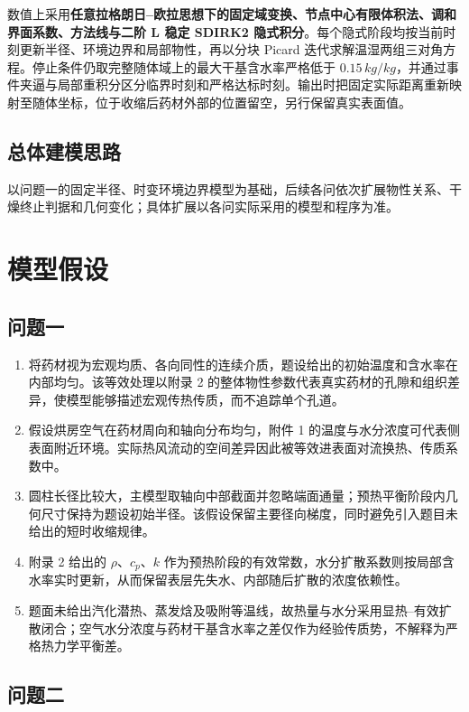 \documentclass[withoutpreface,bwprint]{cumcmthesis}
\begin{document}
数值上采用\textbf{任意拉格朗日--欧拉思想下的固定域变换、节点中心有限体积法、调和界面系数、方法线与二阶 L 稳定 SDIRK2 隐式积分}。每个隐式阶段均按当前时刻更新半径、环境边界和局部物性，再以分块 Picard 迭代求解温湿两组三对角方程。停止条件仍取完整随体域上的最大干基含水率严格低于 $0.15\,\si{kg/kg}$，并通过事件夹逼与局部重积分区分临界时刻和严格达标时刻。输出时把固定实际距离重新映射至随体坐标，位于收缩后药材外部的位置留空，另行保留真实表面值。

\subsection{总体建模思路}

以问题一的固定半径、时变环境边界模型为基础，后续各问依次扩展物性关系、干燥终止判据和几何变化；具体扩展以各问实际采用的模型和程序为准。

\section{模型假设}

\subsection{问题一}

\begin{enumerate}
  \item 将药材视为宏观均质、各向同性的连续介质，题设给出的初始温度和含水率在内部均匀。该等效处理以附录 2 的整体物性参数代表真实药材的孔隙和组织差异，使模型能够描述宏观传热传质，而不追踪单个孔道。
  \item 假设烘房空气在药材周向和轴向分布均匀，附件 1 的温度与水分浓度可代表侧表面附近环境。实际热风流动的空间差异因此被等效进表面对流换热、传质系数中。
  \item 圆柱长径比较大，主模型取轴向中部截面并忽略端面通量；预热平衡阶段内几何尺寸保持为题设初始半径。该假设保留主要径向梯度，同时避免引入题目未给出的短时收缩规律。
  \item 附录 2 给出的 $\rho$、$c_p$、$k$ 作为预热阶段的有效常数，水分扩散系数则按局部含水率实时更新，从而保留表层先失水、内部随后扩散的浓度依赖性。
  \item 题面未给出汽化潜热、蒸发焓及吸附等温线，故热量与水分采用显热--有效扩散闭合；空气水分浓度与药材干基含水率之差仅作为经验传质势，不解释为严格热力学平衡差。
\end{enumerate}

\subsection{问题二}
\end{document}
